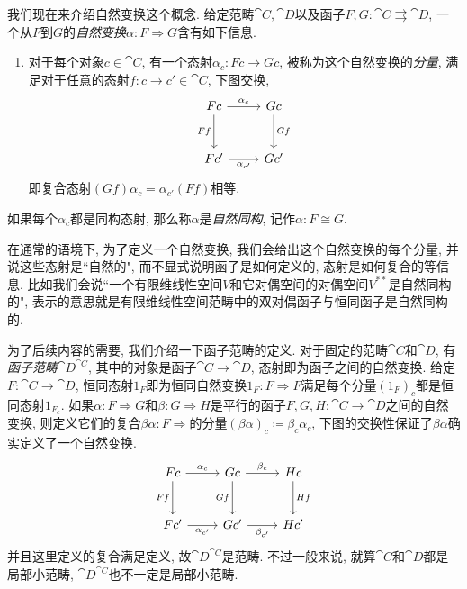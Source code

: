 我们现在来介绍自然变换这个概念. 给定范畴$\cat{C}, \cat{D}$以及函子$F, G\colon \cat{C}\rightrightarrows\cat{D}$, 一个从$F$到$G$的\emph{自然变换}$\alpha\colon F\Rightarrow G$含有如下信息.
\begin{enumerate}
  \item 对于每个对象$c\in\cat{C}$, 有一个态射$\alpha_c\colon Fc\to Gc$, 被称为这个自然变换的\emph{分量}, 满足对于任意的态射$f\colon c\to c'\in\cat{C}$, 下图交换,
  \begin{equation}
    \begin{tikzcd}[row sep=large]
      Fc \arrow[r, "\alpha_c"{above}] \arrow[d, "Ff"{left}] & Gc \arrow[d, "Gf"{right}] \\
      Fc' \arrow[r, "\alpha_{c'}"{below}] & Gc'
    \end{tikzcd}
    \end{equation}
  即复合态射$(Gf)\alpha_c=\alpha_{c'}(Ff)$相等.
\end{enumerate}
如果每个$\alpha_c$都是同构态射, 那么称$\alpha$是\emph{自然同构}, 记作$\alpha\colon F\cong G$.

在通常的语境下, 为了定义一个自然变换, 我们会给出这个自然变换的每个分量, 并说这些态射是``自然的", 而不显式说明函子是如何定义的, 态射是如何复合的等信息. 比如我们会说``一个有限维线性空间$V$和它对偶空间的对偶空间$V^{**}$是自然同构的", 表示的意思就是有限维线性空间范畴中的双对偶函子与恒同函子是自然同构的.


为了后续内容的需要, 我们介绍一下函子范畴的定义. 对于固定的范畴$\cat{C}$和$\cat{D}$, 有\emph{函子范畴}$\cat{D}^{\cat{C}}$, 其中的对象是函子$\cat{C}\to\cat{D}$, 态射即为函子之间的自然变换. 给定$F\colon \cat{C}\to \cat{D}$, 恒同态射$1_F$即为恒同自然变换$1_F\colon F\Rightarrow F$满足每个分量$(1_F)_c$都是恒同态射$1_{F_c}$. 如果$\alpha\colon F\Rightarrow G$和$\beta\colon G\Rightarrow H$是平行的函子$F, G, H\colon \cat{C}\to \cat{D}$之间的自然变换, 则定义它们的复合$\beta\alpha\colon F\Rightarrow$的分量$(\beta\alpha)_c\coloneq \beta_c\alpha_c$, 下图的交换性保证了$\beta\alpha$确实定义了一个自然变换\parencite[44, Lemma 1.7.1]{riehl_category_2017}.
\begin{equation*}
  \begin{tikzcd}[row sep=large]
    Fc & Gc & Hc\\
    Fc' & Gc' & Hc'
    \arrow[from=1-1,]{1-2}[above]{\alpha_c}
    \arrow[from=1-2,]{1-3}[above]{\beta_c}
    \arrow[from=2-1,]{2-2}[below]{\alpha_{c'}}
    \arrow[from=2-2,]{2-3}[below]{\beta_{c'}}
    \arrow[from=1-1,]{2-1}[left]{Ff}
    \arrow[from=1-2,]{2-2}[left]{Gf}
    \arrow[from=1-3,]{2-3}[right]{Hf}
  \end{tikzcd}
\end{equation*}
并且这里定义的复合满足定义\parencite[44, Corollary 1.7.2]{riehl_category_2017}, 故$\cat{D}^{\cat{C}}$是范畴. 不过一般来说, 就算$\cat{C}$和$\cat{D}$都是局部小范畴, $\cat{D}^{\cat{C}}$也不一定是局部小范畴.

